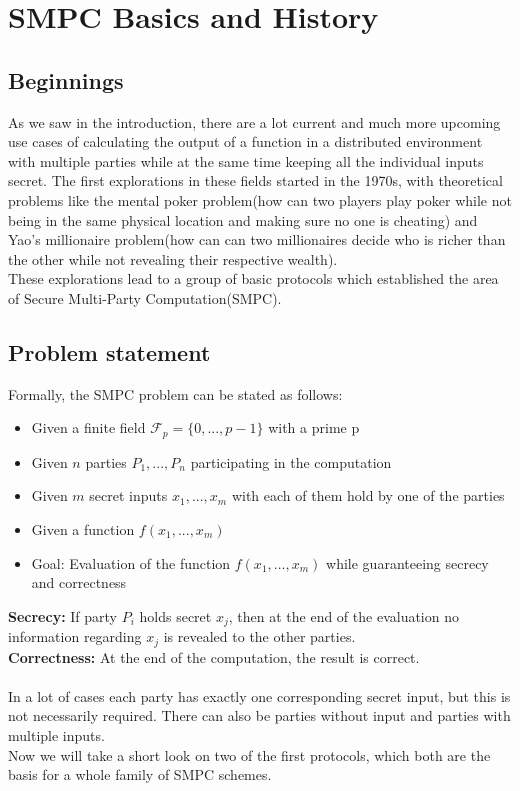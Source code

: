 \documentclass[english,runningheads,a4paper]{llncs}[2018/03/10]
\begin{document}
\section{SMPC Basics and History}\label{sec:smpc}
\subsection{Beginnings}
As we saw in the introduction, there are a lot current and much more upcoming use cases of calculating the output of a function in a distributed environment with multiple parties while at the same time keeping all the individual inputs secret. The first explorations in these fields started in the 1970s, with theoretical problems like the mental poker problem(how can two players play poker while not being in the same physical location and making sure no one is cheating) and Yao's millionaire problem(how can can two millionaires decide who is richer than the other while not revealing their respective wealth). \\
These explorations lead to a group of basic protocols which established the area of Secure Multi-Party Computation(SMPC).\\
\subsection{Problem statement}
Formally, the SMPC problem can be stated as follows:
\begin{itemize}
\item Given a finite field \( \mathcal{F}_p=\{0,...,p-1\}\) with a prime p
\item Given \(n\) parties \(P_1,...,P_n\) participating in the computation
\item Given \(m\) secret inputs \(x_1,...,x_m\) with each of them hold by one of the parties
\item Given a function \(f(x_1,...,x_m)\)
\item Goal: Evaluation of the function \(f(x_1,...,x_m)\) while guaranteeing secrecy and correctness
\end{itemize}
\textbf{Secrecy:} If party \(P_i\) holds secret \(x_j\), then at the end of the evaluation no information regarding \(x_j\) is revealed to the other parties.\\
\textbf{Correctness:} At the end of the computation, the result is correct.\\\\
In a lot of cases each party has exactly one corresponding secret input, but this is not necessarily required. There can also be parties without input and parties with multiple inputs.\\
Now we will take a short look on two of the first protocols, which both are the basis for a whole family of SMPC schemes.
\end{document}
